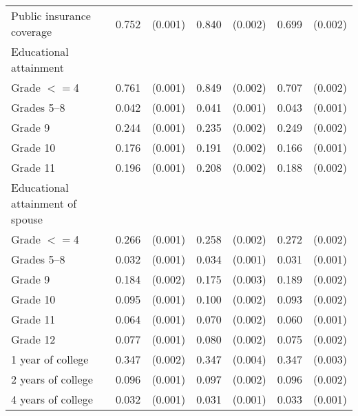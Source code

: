 \begin{tabular}{lcccccc}
 \hspace{0.3cm}  Public insurance coverage  & 0.752 & (0.001)  & 0.840 & (0.002)  & 0.699 & (0.002)  \\
 Educational attainment  & & &  \\
 \hspace{0.3cm} Grade $<=$4  & 0.761 & (0.001)  & 0.849 & (0.002)  & 0.707 & (0.002)  \\
 \hspace{0.3cm}  Grades 5--8  & 0.042 & (0.001)  & 0.041 & (0.001)  & 0.043 & (0.001)  \\
 \hspace{0.3cm} Grade 9  & 0.244 & (0.001)  & 0.235 & (0.002)  & 0.249 & (0.002)  \\
 \hspace{0.3cm} Grade 10  & 0.176 & (0.001)  & 0.191 & (0.002)  & 0.166 & (0.001)  \\
 \hspace{0.3cm} Grade 11  & 0.196 & (0.001)  & 0.208 & (0.002)  & 0.188 & (0.002)  \\
 Educational attainment of spouse  & & &  \\
 \hspace{0.3cm} Grade $<=$4  & 0.266 & (0.001)  & 0.258 & (0.002)  & 0.272 & (0.002)  \\
 \hspace{0.3cm}  Grades 5--8  & 0.032 & (0.001)  & 0.034 & (0.001)  & 0.031 & (0.001)  \\
 \hspace{0.3cm} Grade 9  & 0.184 & (0.002)  & 0.175 & (0.003)  & 0.189 & (0.002)  \\
 \hspace{0.3cm} Grade 10  & 0.095 & (0.001)  & 0.100 & (0.002)  & 0.093 & (0.002)  \\
 \hspace{0.3cm} Grade 11  & 0.064 & (0.001)  & 0.070 & (0.002)  & 0.060 & (0.001)  \\
 \hspace{0.3cm} Grade 12  & 0.077 & (0.001)  & 0.080 & (0.002)  & 0.075 & (0.002)  \\
 \hspace{0.3cm} 1 year of college  & 0.347 & (0.002)  & 0.347 & (0.004)  & 0.347 & (0.003)  \\
 \hspace{0.3cm} 2 years of college  & 0.096 & (0.001)  & 0.097 & (0.002)  & 0.096 & (0.002)  \\
 \hspace{0.3cm} 4 years of college  & 0.032 & (0.001)  & 0.031 & (0.001)  & 0.033 & (0.001)  \\

\end{tabular}
